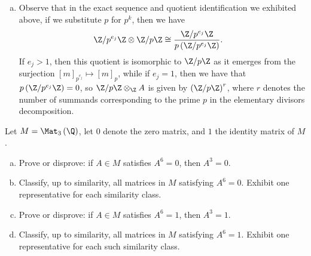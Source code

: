 \documentclass[10pt]{mypackage}
\begin{document}
\begin{solution}
\begin{enumerate}[(a)]
      Now, we may write
      \begin{align*}
        \Z/p^{k}\Z\otimes_{\Z}A &= \bigoplus_{j=1}^{s}\Z/p^{k}\Z\otimes_{\Z}\Z/p^{e_j}\Z
      \end{align*}
      for some multiset $\set{e_j}_{j=1}^{s}$ of indices, again by the elementary divisors decomposition (this time applied to $A_p$). Observe that each of the $e_j$ are less than or equal to $k$. Furthermore, we have the exact sequence
      \begin{align*}
        \Z\xrightarrow{\cdot p^{k}}\Z\rightarrow \Z/p^{k}\Z\rightarrow 0,
      \end{align*}
      and since tensor products preserve surjections, we find taking the tensor product with $\Z/p^{e_j}\Z$, we get
      \begin{align*}
        \Z/p^{e_j}\Z\xrightarrow{\cdot p^{k}}\Z/p^{e_j}\Z\rightarrow \Z/p^{e_j}\Z\otimes_{\Z}\Z/p^{k}\Z\rightarrow 0.
      \end{align*}
      We observe then that 
      \begin{align*}
        \Z/p^{e_j}\Z\otimes \Z/p^{k}\Z &\cong  \frac{\Z/p^{e_j}\Z}{p^{k}\left( \Z/p^{e_j}\Z \right)}.
      \end{align*}
      Observe that $p^{k}\left( \Z/p^{e_j}\Z \right)$ is zero whenever $k\geq e_j$, so that $\Z/p^{e_j}\Z\otimes \Z/p^{k}\Z\cong \Z/p^{e_j}\Z$ for each summand in the tensor product. This gives our desired result that $\Z/p^{k}\Z\otimes A\cong A_p$.
    \item Observe that in the exact sequence and quotient identification we exhibited above, if we substitute $p$ for $p^{k}$, then we have
      \begin{align*}
        \Z/p^{e_j}\Z\otimes \Z/p\Z &\cong \frac{\Z/p^{e_j}\Z}{p\left( \Z/p^{e_j}\Z \right)}.
      \end{align*}
      If $e_j> 1$, then this quotient is isomorphic to $\Z/p\Z$ as it emerges from the surjection $[m]_{p^{e_j}}\mapsto [m]_{p}$, while if $e_j = 1$, then we have that $p\left( \Z/p^{e_j}\Z \right) = 0$, so $\Z/p\Z\otimes_{\Z}A$ is given by $\left( \Z/p\Z \right)^{r}$, where $r$ denotes the number of summands corresponding to the prime $p$ in the elementary divisors decomposition.
  \end{enumerate}
\end{solution}
\begin{problem}[Problem 5]
  Let $M = \Mat_3\left( \Q \right)$, let $0$ denote the zero matrix, and $1$ the identity matrix of $M$.
  \begin{enumerate}[(a)]
    \item Prove or disprove: if $A\in M$ satisfies $A^{6} = 0$, then $A^{3} = 0$.
    \item Classify, up to similarity, all matrices in $M$ satisfying $A^{6} = 0$. Exhibit one representative for each similarity class.
    \item Prove or disprove: if $A\in M$ satisfies $A^{6} = 1$, then $A^{3} = 1$.
    \item Classify, up to similarity, all matrices in $M$ satisfying $A^{6} = 1$. Exhibit one representative for each such similarity class.
  \end{enumerate}
\end{problem}
\end{document}
